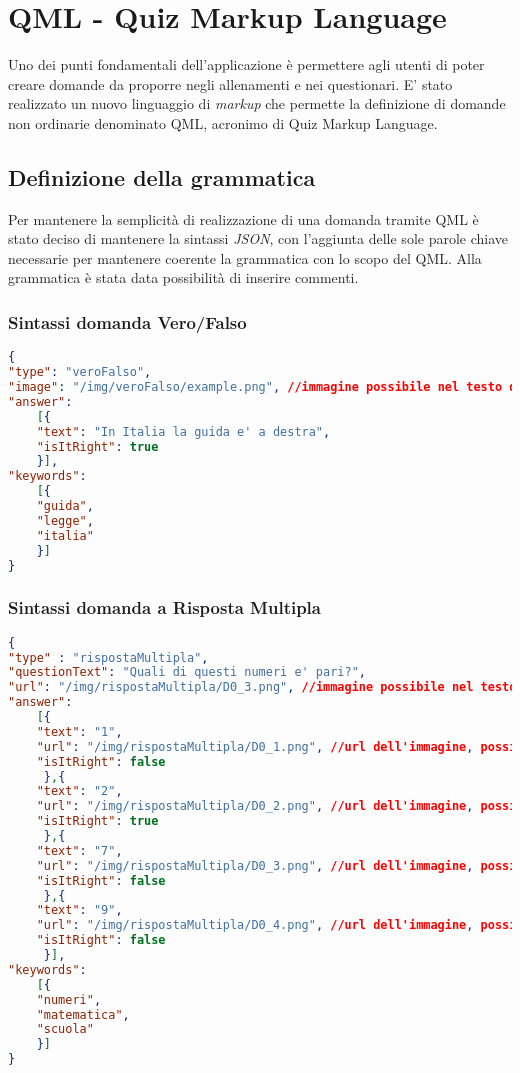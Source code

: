 \newpage
\section{QML - Quiz Markup Language}
Uno dei punti fondamentali dell'applicazione è permettere agli utenti di poter creare domande da proporre negli allenamenti e nei questionari. E' stato realizzato un nuovo linguaggio di \textit{markup} che permette la definizione di domande non ordinarie denominato QML, acronimo di Quiz Markup Language.

\subsection{Definizione della grammatica}
Per mantenere la semplicità di realizzazione di una domanda tramite QML è stato deciso di mantenere la sintassi \textit{JSON}, con l'aggiunta delle sole parole chiave necessarie per mantenere coerente la grammatica con lo scopo del QML. Alla grammatica è stata data possibilità di inserire commenti.

\subsubsection{Sintassi domanda Vero/Falso}
\begin{lstlisting}[language=json,firstnumber=1]
{	
"type": "veroFalso",
"image": "/img/veroFalso/example.png", //immagine possibile nel testo della domanda vero e falso
"answer":
	[{
	"text": "In Italia la guida e' a destra",
	"isItRight": true
	}],
"keywords":
	[{
	"guida",
	"legge",
	"italia"
	}] 
}
\end{lstlisting}

\subsubsection{Sintassi domanda a Risposta Multipla}
\begin{lstlisting}[language=json,firstnumber=1]
{	
"type" : "rispostaMultipla",
"questionText": "Quali di questi numeri e' pari?",
"url": "/img/rispostaMultipla/D0_3.png", //immagine possibile nel testo della domanda risposta multipla
"answer":
	[{
	"text": "1",
	"url": "/img/rispostaMultipla/D0_1.png", //url dell'immagine, possibile campo facoltativo
	"isItRight": false
	 },{
	"text": "2",
	"url": "/img/rispostaMultipla/D0_2.png", //url dell'immagine, possibile campo facoltativo
	"isItRight": true
	 },{
	"text": "7",
	"url": "/img/rispostaMultipla/D0_3.png", //url dell'immagine, possibile campo facoltativo
	"isItRight": false
	 },{
	"text": "9",
	"url": "/img/rispostaMultipla/D0_4.png", //url dell'immagine, possibile campo facoltativo
	"isItRight": false
	 }],
"keywords":
	[{
	"numeri",
	"matematica",
	"scuola"
	}]
}
\end{lstlisting}

